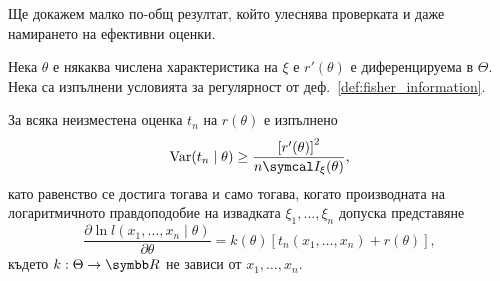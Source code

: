 \documentclass[numbers=endperiod, bibliography=totocnumbered]{scrartcl}
\begin{document}
Ще докажем малко по-общ резултат, който улеснява проверката и даже намирането на ефективни оценки.
\begin{theorem}\label{thm:rao_cramer}
  Нека \( \theta \) е някаква числена характеристика на \( \xi \) е \( r'(\theta) \) е диференцируема в \( \Theta \). Нека са изпълнени условията за регулярност от деф.~\ref{def:fisher_information}.

  За всяка неизместена оценка \( t_n \) на \( r(\theta) \) е изпълнено
  \begin{equation*}
    \Var(t_n \mid \theta) \geq \frac {{\left[r'(\theta) \right]}^2} {n \FisherInfo_\xi(\theta)},
  \end{equation*}
  като равенство се достига тогава и само тогава, когато производната на логаритмичното правдоподобие на извадката \( \xi_1, \ldots, \xi_n \) допуска представяне
  \begin{equation*}
    \frac {\partial \ln l(x_1, \ldots, x_n \mid \theta)} {\partial \theta}
    =
    k(\theta) [t_n(x_1, \ldots, x_n) + r(\theta)],
  \end{equation*}
  където \( k: \Theta \to \R \) не зависи от \( x_1, \ldots, x_n \).
\end{theorem}
\end{document}
